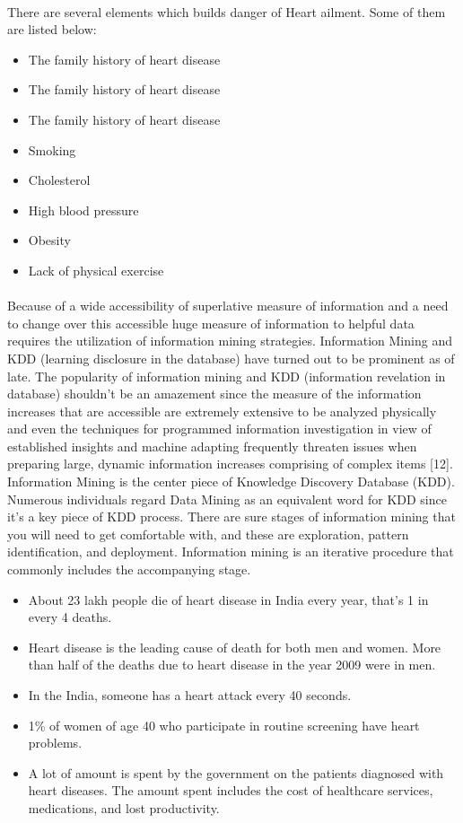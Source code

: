\documentclass{book}
\begin{document}
     \paragraph{}
    There are several elements which builds danger of Heart ailment. Some of them are listed below:
    \begin{itemize}
    	\item The family history of heart disease
    	\item The family history of heart disease
    	\item The family history of heart disease
    	\item Smoking
    	\item Cholesterol
    	\item High blood pressure
    	\item Obesity
    	\item Lack of physical exercise
    \end{itemize}
    \paragraph{}
    Because of a wide accessibility of superlative measure of information and a need to change over this accessible huge measure of information to helpful data requires the utilization of information mining strategies. Information Mining and KDD (learning disclosure in the database) have turned out to be prominent as of late. The popularity of information mining and KDD (information revelation in database) shouldn't be an amazement since the measure of the information increases that are accessible are extremely extensive to be analyzed physically and even the techniques for programmed information investigation in view of established insights and machine adapting frequently threaten issues when preparing large, dynamic information increases comprising of complex items [12]. Information Mining is the center piece of Knowledge Discovery Database (KDD). Numerous individuals regard Data Mining as an equivalent word for KDD since it's a key piece of KDD process. There are sure stages of information mining that you will need to get comfortable with, and these are exploration, pattern identification, and deployment. Information mining is an iterative procedure that commonly includes the accompanying stage.
    \pagebreak
    \begin{itemize}
    	\item About 23 lakh people die of heart disease in India every year, that’s 1 in every 4 deaths.
    	\item Heart disease is the leading cause of death for both men and women. More than half of the deaths due to heart disease in the year 2009 were in men.
    	\item In the India, someone has a heart attack every 40 seconds.
    	\item 1\% of women of age 40 who participate in routine screening have heart problems.
    	\item A lot of amount is spent by the government on the patients diagnosed with heart diseases. The amount spent includes the cost of healthcare services, medications, and lost productivity.
    \end{itemize}
    
\end{document}
